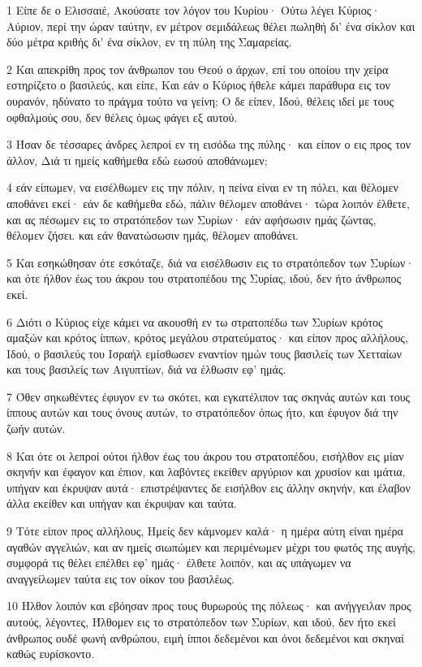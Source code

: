 \par 1 Είπε δε ο Ελισσαιέ, Ακούσατε τον λόγον του Κυρίου· Ούτω λέγει Κύριος· Αύριον, περί την ώραν ταύτην, εν μέτρον σεμιδάλεως θέλει πωληθή δι' ένα σίκλον και δύο μέτρα κριθής δι' ένα σίκλον, εν τη πύλη της Σαμαρείας.
\par 2 Και απεκρίθη προς τον άνθρωπον του Θεού ο άρχων, επί του οποίου την χείρα εστηρίζετο ο βασιλεύς, και είπε, Και εάν ο Κύριος ήθελε κάμει παράθυρα εις τον ουρανόν, ηδύνατο το πράγμα τούτο να γείνη; Ο δε είπεν, Ιδού, θέλεις ιδεί με τους οφθαλμούς σου, δεν θέλεις όμως φάγει εξ αυτού.
\par 3 Ήσαν δε τέσσαρες άνδρες λεπροί εν τη εισόδω της πύλης· και είπον ο εις προς τον άλλον, Διά τι ημείς καθήμεθα εδώ εωσού αποθάνωμεν;
\par 4 εάν είπωμεν, να εισέλθωμεν εις την πόλιν, η πείνα είναι εν τη πόλει, και θέλομεν αποθάνει εκεί· εάν δε καθήμεθα εδώ, πάλιν θέλομεν αποθάνει· τώρα λοιπόν έλθετε, και ας πέσωμεν εις το στρατόπεδον των Συρίων· εάν αφήσωσιν ημάς ζώντας, θέλομεν ζήσει. και εάν θανατώσωσιν ημάς, θέλομεν αποθάνει.
\par 5 Και εσηκώθησαν ότε εσκόταζε, διά να εισέλθωσιν εις το στρατόπεδον των Συρίων· και ότε ήλθον έως του άκρου του στρατοπέδου της Συρίας, ιδού, δεν ήτο άνθρωπος εκεί.
\par 6 Διότι ο Κύριος είχε κάμει να ακουσθή εν τω στρατοπέδω των Συρίων κρότος αμαξών και κρότος ίππων, κρότος μεγάλου στρατεύματος· και είπον προς αλλήλους, Ιδού, ο βασιλεύς του Ισραήλ εμίσθωσεν εναντίον ημών τους βασιλείς των Χετταίων και τους βασιλείς των Αιγυπτίων, διά να έλθωσιν εφ' ημάς.
\par 7 Όθεν σηκωθέντες έφυγον εν τω σκότει, και εγκατέλιπον τας σκηνάς αυτών και τους ίππους αυτών και τους όνους αυτών, το στρατόπεδον όπως ήτο, και έφυγον διά την ζωήν αυτών.
\par 8 Και ότε οι λεπροί ούτοι ήλθον έως του άκρου του στρατοπέδου, εισήλθον εις μίαν σκηνήν και έφαγον και έπιον, και λαβόντες εκείθεν αργύριον και χρυσίον και ιμάτια, υπήγαν και έκρυψαν αυτά· επιστρέψαντες δε εισήλθον εις άλλην σκηνήν, και έλαβον άλλα εκείθεν και υπήγαν και έκρυψαν και ταύτα.
\par 9 Τότε είπον προς αλλήλους, Ημείς δεν κάμνομεν καλά· η ημέρα αύτη είναι ημέρα αγαθών αγγελιών, και αν ημείς σιωπώμεν και περιμένωμεν μέχρι του φωτός της αυγής, συμφορά τις θέλει επέλθει εφ' ημάς· έλθετε λοιπόν, και ας υπάγωμεν να αναγγείλωμεν ταύτα εις τον οίκον του βασιλέως.
\par 10 Ήλθον λοιπόν και εβόησαν προς τους θυρωρούς της πόλεως· και ανήγγειλαν προς αυτούς, λέγοντες, Ήλθομεν εις το στρατόπεδον των Συρίων, και ιδού, δεν ήτο εκεί άνθρωπος ουδέ φωνή ανθρώπου, ειμή ίπποι δεδεμένοι και όνοι δεδεμένοι και σκηναί καθώς ευρίσκοντο.
